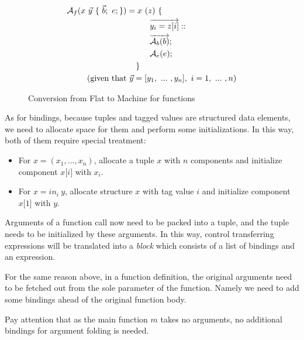 \documentclass{article}
\theoremstyle{definition}
\theoremstyle{remark}
\numberwithin{equation}{section}
\begin{document}
\begin{figure}[!ht]
  \centering
\begin{align*}
\mathcal{A}_f(x\ \vec{y}\ \{\ \vec{b};\ e; \})
    &= x\ (z)\ \{\\
    &\kern1cm \overrightarrow{y_i=z[i]}::\\
    &\kern1cm \overrightarrow{\mathcal{A}_b(b)};\\
    &\kern1cm \mathcal{A}_e(e); \\
    &\kern0.4cm \}\\
    (\textrm{given that}&\ \vec{y}=[y_1,\ ...\ , y_n],\ i =1,\ ...\ ,n)
\end{align*}
  \caption{Conversion from Flat to Machine for functions}
  \label{fig-sub}
\end{figure}

As for bindings, because tuples and tagged values are structured data elements,
we need to allocate space for them and perform some initializations. In this way,
both of them require special treatment:
\begin{itemize}
  \item For $x=(x_1, ..., x_n)$, allocate a tuple $x$ with $n$ components and initialize
    component $x\texttt{[}i\texttt{]}$ with $x_i$.
  \item For $x=in_i\ y$, allocate structure $x$ with tag value $i$ and initialize
    component $x\texttt{[}1\texttt{]}$ with $y$.
\end{itemize}

Arguments of a function call now need to be packed
into a tuple, and the tuple needs to be initialized by these arguments. In this way,
 control transferring expressions will be translated into a \textit{block} which
 consists of a list of bindings and an expression.

For the same reason above, in a function definition, the original arguments
need to be fetched out from the sole parameter of the function. Namely we
need to add some bindings ahead of the original function body.

Pay attention that as the main function $m$ takes no arguments, no additional
bindings for argument folding is needed.\\

\end{document}
